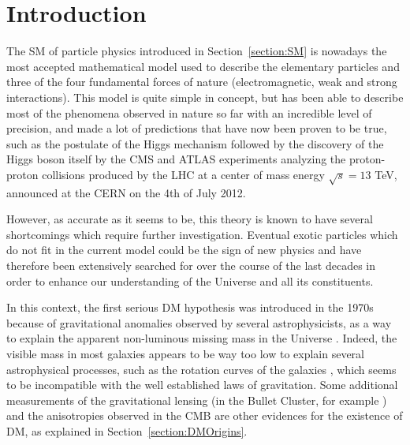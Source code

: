 \documentclass[a4paper, 10pt, openright]{report}
\begin{document}
\tableofcontents

\thispagestyle{empty}
\newpage


\clearpage
\thispagestyle{empty}
\phantom{a}
\vfill
\newpage

\setlength{\parskip}{10pt}


\chapter{Introduction}

The \ac{SM} of particle physics introduced in Section~\ref{section:SM} is nowadays the most accepted mathematical model used to describe the elementary particles and three of the four fundamental forces of nature (electromagnetic, weak and strong interactions). This model is quite simple in concept, but has been able to describe most of the phenomena observed in nature so far with an incredible level of precision, and made a lot of predictions that have now been proven to be true, such as the postulate of the Higgs mechanism \cite{HiggsPostulate1, HiggsPostulate2} followed by the discovery of the Higgs boson itself \cite{HiggsDiscovery1, HiggsDiscovery2} by the \ac{CMS} and \ac{ATLAS} experiments analyzing the proton-proton collisions produced by the \acf{LHC} at a center of mass energy $\sqrt{s} = 13$ TeV, announced at the \ac{CERN} on the 4th of July 2012. 

However, as accurate as it seems to be, this theory is known to have several shortcomings which require further investigation. Eventual exotic particles which do not fit in the current model could be the sign of new physics and have therefore been extensively searched for over the course of the last decades in order to enhance our understanding of the Universe and all its constituents.

In this context, the first serious \ac{DM} hypothesis was introduced in the 1970s because of gravitational anomalies observed by several astrophysicists, as a way to explain the apparent non-luminous missing mass in the Universe \cite{FirstEvidence}. Indeed, the visible mass in most galaxies appears to be way too low to explain several astrophysical processes, such as the rotation curves of the galaxies \cite{RotationCurves}, which seems to be incompatible with the well established laws of gravitation. Some additional measurements of the gravitational lensing (in the Bullet Cluster, for example \cite{BulletCluster}) and the anisotropies observed in the \ac{CMB} \cite{CMBAnisotropies} are other evidences for the existence of \ac{DM}, as explained in Section~\ref{section:DMOrigins}.
\end{document}

